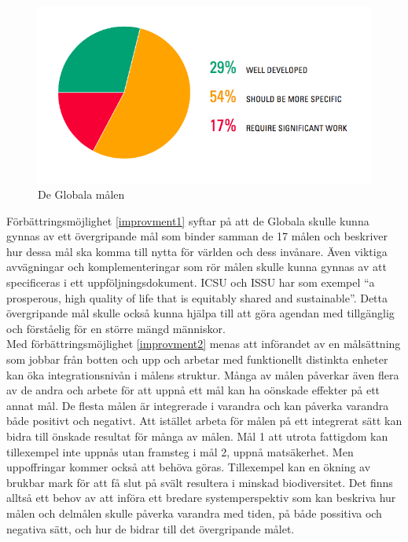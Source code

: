 \documentclass{report}
\begin{document}
\begin{figure}[h] \label{fig1}
\label{improvments}
\includegraphics[width=\linewidth]{improvments.png}
\caption{De Globala målen \cite{review}} 
\end{figure}

Förbättringsmöjlighet \ref{improvment1} syftar på att de Globala skulle kunna gynnas av ett övergripande mål som binder samman de 17 målen och beskriver hur dessa mål ska komma till nytta för världen och dess invånare. Även viktiga avvägningar och komplementeringar som rör målen skulle kunna gynnas av att specificeras i ett uppföljningsdokument. ICSU och ISSU har som exempel “a prosperous, high quality of life that is equitably shared and sustainable”. Detta övergripande mål skulle också kunna hjälpa till att göra agendan med tillgänglig och förståelig för en större mängd människor. \cite{C}\\

Med förbättringsmöjlighet \ref{improvment2} menas att införandet av en målsättning som jobbar från botten och upp och arbetar med funktionellt distinkta enheter kan öka integrationsnivån i målens struktur.\cite{Weitz}
Många av målen påverkar även flera av de andra och arbete för att uppnå ett mål kan ha oönskade effekter på ett annat mål. De flesta målen är integrerade i varandra och kan påverka varandra både positivt och negativt. Att istället arbeta för målen på ett integrerat sätt kan bidra till önskade resultat för många av målen. Mål 1 att utrota fattigdom kan tillexempel inte uppnås utan framsteg i mål 2, uppnå matsäkerhet. Men uppoffringar kommer också att behöva göras. Tillexempel kan en ökning av brukbar mark för att få slut på svält resultera i minskad biodiversitet. Det finns alltså ett behov av att införa ett bredare systemperspektiv som kan beskriva hur målen och delmålen skulle påverka varandra med tiden, på både possitiva och negativa sätt, och hur de bidrar till det övergripande målet. \cite{review}\\
\end{document}
